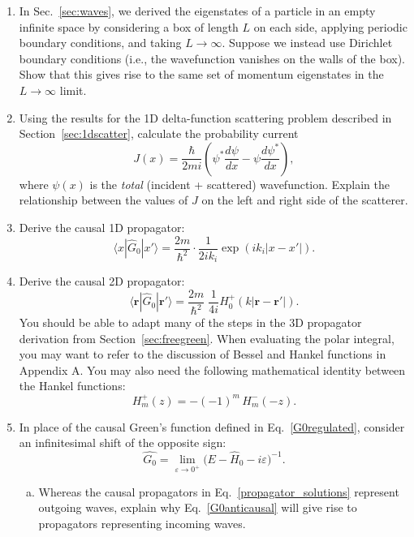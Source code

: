 \documentclass[pra,12pt]{revtex4-2}
\begin{document}
\begin{enumerate}
\item In Sec.~\ref{sec:waves}, we derived the eigenstates of a
  particle in an empty infinite space by considering a box of length
  $L$ on each side, applying periodic boundary conditions, and taking
  $L \rightarrow \infty$.  Suppose we instead use Dirichlet boundary
  conditions (i.e., the wavefunction vanishes on the walls of the
  box).  Show that this gives rise to the same set of momentum
  eigenstates in the $L \rightarrow \infty$ limit.

\item Using the results for the 1D delta-function scattering problem
  described in Section~\ref{sec:1dscatter}, calculate the probability
  current
  \begin{equation}
    J(x) = \frac{\hbar}{2mi}\left(\psi^*\frac{d\psi}{dx} - \psi\frac{d\psi^*}{dx}\right),
  \end{equation}
  where $\psi(x)$ is the \textit{total} (incident + scattered)
  wavefunction.  Explain the relationship between the values of $J$ on
  the left and right side of the scatterer.

\item \label{ex:1dpropagator}
  Derive the causal 1D propagator:
  \begin{equation}
    \langle x|\hat{G}_0|x'\rangle = \frac{2m}{\hbar^2} \cdot \frac{1}{2ik_i} \exp\left(ik_i|x-x'|\right).
  \end{equation}

\item \label{ex:2dpropagator}
  Derive the causal 2D propagator:
  \begin{equation}
    \langle\mathbf{r}|\hat{G}_0|\mathbf{r}'\rangle = \frac{2m}{\hbar^2}\;
    \frac{1}{4i} H^+_0(k|\mathbf{r}-\mathbf{r'}|).
  \end{equation}
  You should be able to adapt many of the steps in the 3D propagator
  derivation from Section~\ref{sec:freegreen}.  When evaluating the
  polar integral, you may want to refer to the discussion of Bessel
  and Hankel functions in Appendix A.  You may also need the following
  mathematical identity between the Hankel functions:
  \begin{equation}
    H_m^+(z) = - (-1)^m \, H_m^-(-z).
  \end{equation}
  
\item \label{ex:anticausal}
  In place of the causal Green's function defined in
  Eq.~\eqref{G0regulated}, consider an infinitesimal shift of the
  opposite sign:
  \begin{equation}
    \hat{G_0} = \lim_{\varepsilon\rightarrow 0^+} \big(E - \hat{H}_0 - i \varepsilon\big)^{-1}.
    \label{G0anticausal}
  \end{equation}
  \begin{enumerate}[(a)]
  \item 
  Whereas the causal propagators in Eq.~\eqref{propagator_solutions}
  represent outgoing waves, explain why Eq.~\eqref{G0anticausal} will
  give rise to propagators representing incoming waves.


\end{enumerate}
\end{enumerate}
\end{document}

